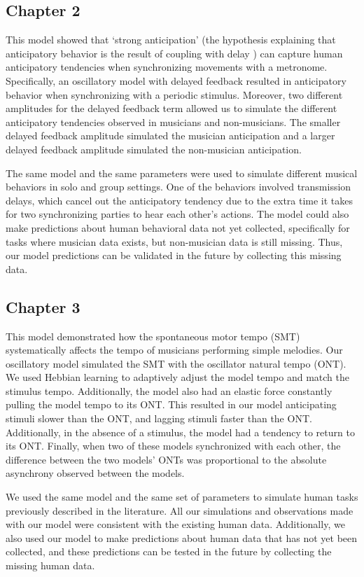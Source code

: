 \documentclass{report}
\begin{document}
\subsection{Chapter 2}
This model showed that `strong anticipation' (the hypothesis explaining that anticipatory behavior is the result of coupling with delay \cite{stepp2010strong}) can capture human anticipatory tendencies when synchronizing movements with a metronome. Specifically, an oscillatory model with delayed feedback resulted in anticipatory behavior when synchronizing with a periodic stimulus. Moreover, two different amplitudes for the delayed feedback term allowed us to simulate the different anticipatory tendencies observed in musicians and non-musicians. The smaller delayed feedback amplitude simulated the musician anticipation and a larger delayed feedback amplitude simulated the non-musician anticipation. 
    
The same model and the same parameters were used to simulate different musical behaviors in solo and group settings. One of the behaviors involved transmission delays, which cancel out the anticipatory tendency due to the extra time it takes for two synchronizing parties to hear each other's actions. The model could also make predictions about human behavioral data not yet collected, specifically for tasks where musician data exists, but non-musician data is still missing. Thus, our model predictions can be validated in the future by collecting this missing data.

\subsection{Chapter 3}
This model demonstrated how the spontaneous motor tempo (SMT) systematically affects the tempo of musicians performing simple melodies. Our oscillatory model simulated the SMT with the oscillator natural tempo (ONT). We used Hebbian learning to adaptively adjust the model tempo and match the stimulus tempo. Additionally, the model also had an elastic force constantly pulling the model tempo to its ONT. This resulted in our model anticipating stimuli slower than the ONT, and lagging stimuli faster than the ONT. Additionally, in the absence of a stimulus, the model had a tendency to return to its ONT. Finally, when two of these models synchronized with each other, the difference between the two models' ONTs was proportional to the absolute asynchrony observed between the models.

We used the same model and the same set of parameters to simulate human tasks previously described in the literature. All our simulations and observations made with our model were consistent with the existing human data. Additionally, we also used our model to make predictions about human data that has not yet been collected, and these predictions can be tested in the future by collecting the missing human data.
    
\end{document}
